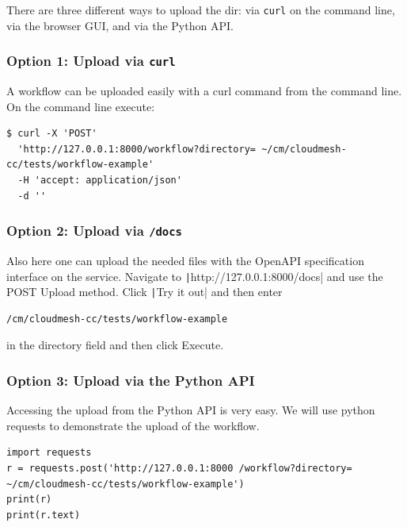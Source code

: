 There are three different ways to upload the dir: via \texttt{curl} on
the command line, via the browser GUI, and via the Python API.

\subsubsection{\texorpdfstring{Option 1: Upload via
\texttt{curl}}{Option 1: Upload via curl}}\label{option-1-upload-via-curl-1}

A workflow can be uploaded easily with a curl command from the command
line. On the command line execute:

\smallskip
\begin{verbatim}
$ curl -X 'POST' 
  'http://127.0.0.1:8000/workflow?directory= ~/cm/cloudmesh-cc/tests/workflow-example' 
  -H 'accept: application/json' 
  -d ''
\end{verbatim}
\smallskip

\subsubsection{\texorpdfstring{Option 2: Upload via
\texttt{/docs}}{Option 2: Upload via /docs}}\label{option-2-upload-via-docs-1}

Also here one can upload the needed files with the OpenAPI specification
interface on the service. Navigate to
\texttt|http://127.0.0.1:8000/docs| and use the POST Upload method. 
Click \texttt|Try it out| and then enter

\begin{verbatim}
/cm/cloudmesh-cc/tests/workflow-example
\end{verbatim}

in the
directory field and then click Execute.

\subsubsection{Option 3: Upload via the Python
API}\label{option-3-upload-via-the-python-api-1}

Accessing the upload from the Python API is very easy. We will use
python requests to demonstrate the upload of the workflow.

\smallskip
\begin{verbatim}
import requests
r = requests.post('http://127.0.0.1:8000 /workflow?directory= ~/cm/cloudmesh-cc/tests/workflow-example')
print(r)
print(r.text)
\end{verbatim}
\smallskip

